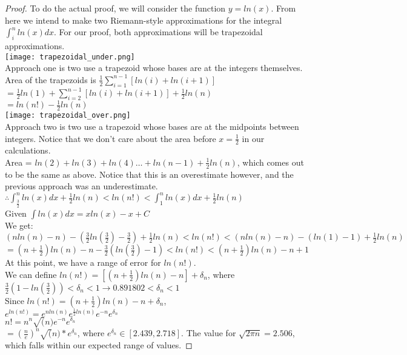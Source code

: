 \documentclass[11pt,twosided]{article}
\begin{document}
\begin{proof}
To do the actual proof, we will consider the function $y=ln(x)$. From here we intend to make two Riemann-style approximations for the integral $\int_{i}^{n}{ln(x)dx}$. For our proof, both approximations will be trapezoidal approximations. \\

\texttt{[image: trapezoidal\_under.png]}\\
Approach one is two use a trapezoid whose bases are at the integers themselves.\\

Area of the trapezoids is $\frac{1}{2}\sum_{i=1}^{n-1}{[ln(i)+ln(i+1)]}$\\
$=\frac{1}{2}ln(1)+\sum_{i=2}^{n-1}{[ln(i)+ln(i+1)]}+\frac{1}{2}ln(n)$\\
$=ln(n!)-\frac{1}{2}ln(n)$\\

\texttt{[image: trapezoidal\_over.png]}\\
Approach two is two use a trapezoid whose bases are at the midpoints between integers. Notice that we don't care about the area before $x=\frac{1}{2}$ in our calculations.\\ 

Area = $ln(2)+ln(3)+ln(4)\dots+ln(n-1)+\frac{1}{2}ln(n)$, which comes out to be the same as above.  Notice that this is an overestimate however, and the previous approach was an underestimate.\\
$\therefore \int_{\frac{3}{2}}^{n}{ln(x)}dx + \frac{1}{2}ln(n) < ln(n!) < \int_{1}^{n}{ln(x)}dx + \frac{1}{2}ln(n)$\\

Given $\int{ln(x)}dx = xln(x) - x + C$\\

We get:\\
$(nln(n)-n)-(\frac{3}{2}ln(\frac{3}{2}) - \frac{3}{2}) + \frac{1}{2}ln(n) < ln(n!) < (nln(n) - n) - (ln(1) - 1) + \frac{1}{2}ln(n)$\\
$=(n+\frac{1}{2})ln(n)-n-\frac{3}{2}(ln(\frac{3}{2}) - 1) < ln(n!) < (n+\frac{1}{2})ln(n) - n + 1$\\

At this point, we have a range of error for $ln(n!)$.\\

We can define $ln(n!) = [(n+\frac{1}{2})ln(n) - n] + \delta_n$, where $\frac{3}{2}(1-ln(\frac{3}{2})) < \delta_n < 1 \longrightarrow 0.891802 < \delta_n < 1$\\

Since $ln(n!) = (n+\frac{1}{2})ln(n) - n + \delta_n$,\\
$e^{ln(n!)} = e^{nln(n)}e^{\frac{1}{2}ln(n)}e^{-n}e^{\delta_n}$\\
$n! = n^n \sqrt(n) e^{-n}e^{\delta_n}$\\
$=(\frac{n}{e})^n \sqrt(n) * e^{\delta_n}$, where $e^{\delta_n} \in [2.439, 2.718]$. The value for $\sqrt{2 \pi n} = 2.506$, which falls within our expected range of values.

\end{proof}
\end{document}
